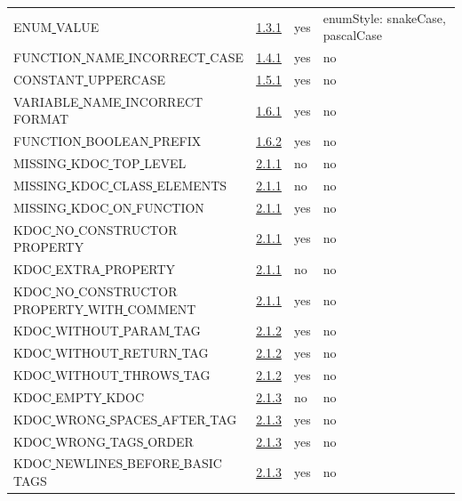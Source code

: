 \begin{longtable}{ |l|p{0.8cm}|p{0.8cm}| p{3cm} | }
ENUM\underline{ }VALUE & \hyperref[sec:1.3.1]{1.3.1} &  yes  &   enumStyle: snakeCase, pascalCase  \\
FUNCTION\underline{ }NAME\underline{ }INCORRECT\underline{ }CASE & \hyperref[sec:1.4.1]{1.4.1} &  yes  &   no  \\
CONSTANT\underline{ }UPPERCASE & \hyperref[sec:1.5.1]{1.5.1} &  yes  &   no  \\
VARIABLE\underline{ }NAME\underline{ }INCORRECT\underline{ }FORMAT & \hyperref[sec:1.6.1]{1.6.1} &  yes  &   no  \\
FUNCTION\underline{ }BOOLEAN\underline{ }PREFIX & \hyperref[sec:1.6.2]{1.6.2} &  yes  &   no  \\
MISSING\underline{ }KDOC\underline{ }TOP\underline{ }LEVEL & \hyperref[sec:2.1.1]{2.1.1} &  no  &   no  \\
MISSING\underline{ }KDOC\underline{ }CLASS\underline{ }ELEMENTS & \hyperref[sec:2.1.1]{2.1.1} &  no  &   no  \\
MISSING\underline{ }KDOC\underline{ }ON\underline{ }FUNCTION & \hyperref[sec:2.1.1]{2.1.1} &  yes  &   no  \\
KDOC\underline{ }NO\underline{ }CONSTRUCTOR\underline{ }PROPERTY & \hyperref[sec:2.1.1]{2.1.1} &  yes  &   no \\
KDOC\underline{ }EXTRA\underline{ }PROPERTY & \hyperref[sec:2.1.1]{2.1.1} &  no  &  no   \\
KDOC\underline{ }NO\underline{ }CONSTRUCTOR\underline{ }PROPERTY\underline{ }WITH\underline{ }COMMENT & \hyperref[sec:2.1.1]{2.1.1} &  yes  &   no \\
KDOC\underline{ }WITHOUT\underline{ }PARAM\underline{ }TAG & \hyperref[sec:2.1.2]{2.1.2} &  yes  &   no  \\
KDOC\underline{ }WITHOUT\underline{ }RETURN\underline{ }TAG & \hyperref[sec:2.1.2]{2.1.2} &  yes  &   no  \\
KDOC\underline{ }WITHOUT\underline{ }THROWS\underline{ }TAG & \hyperref[sec:2.1.2]{2.1.2} &  yes  &   no  \\
KDOC\underline{ }EMPTY\underline{ }KDOC & \hyperref[sec:2.1.3]{2.1.3} &  no  &   no  \\
KDOC\underline{ }WRONG\underline{ }SPACES\underline{ }AFTER\underline{ }TAG & \hyperref[sec:2.1.3]{2.1.3} &  yes  &   no  \\
KDOC\underline{ }WRONG\underline{ }TAGS\underline{ }ORDER & \hyperref[sec:2.1.3]{2.1.3} &  yes  &   no  \\
KDOC\underline{ }NEWLINES\underline{ }BEFORE\underline{ }BASIC\underline{ }TAGS & \hyperref[sec:2.1.3]{2.1.3} &  yes  &   no  \\

\end{longtable}
